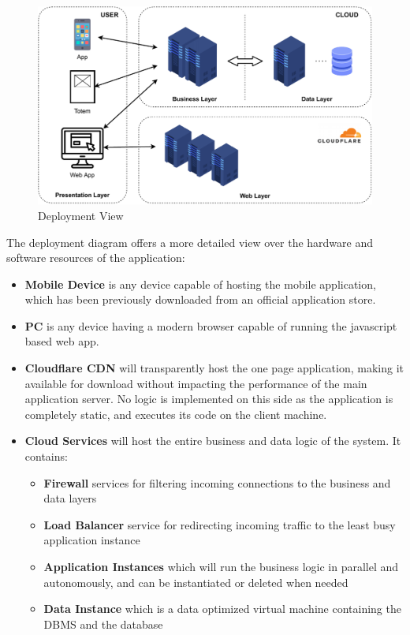 \begin{figure}[H]
    \includegraphics[width=\linewidth]{images/draw.io/deployment.pdf}
    \caption{Deployment View}
    \label{fig:deployment_view}
\end{figure}

The deployment diagram offers a more detailed view over the hardware and software resources of the application:
\begin{itemize}
    \item \textbf{Mobile Device} is any device capable of hosting the mobile application, which has been previously downloaded from an official application store.
    \item \textbf{PC} is any device having a modern browser capable of running the javascript based web app.
    \item \textbf{Cloudflare CDN} will transparently host the one page application, making it available for download without impacting the performance of the main application server. No logic is implemented on this side as the application is completely static, and executes its code on the client machine.
    \item \textbf{Cloud Services} will host the entire business and data logic of the system. It contains:
    \begin{itemize}
        \item \textbf{Firewall} services for filtering incoming connections to the business and data layers
        \item \textbf{Load Balancer} service for redirecting incoming traffic to the least busy application instance
        \item \textbf{Application Instances} which will run the business logic in parallel and autonomously, and can be instantiated or deleted when needed
        \item \textbf{Data Instance} which is a data optimized virtual machine containing the DBMS and the database
    \end{itemize}
\end{itemize}


